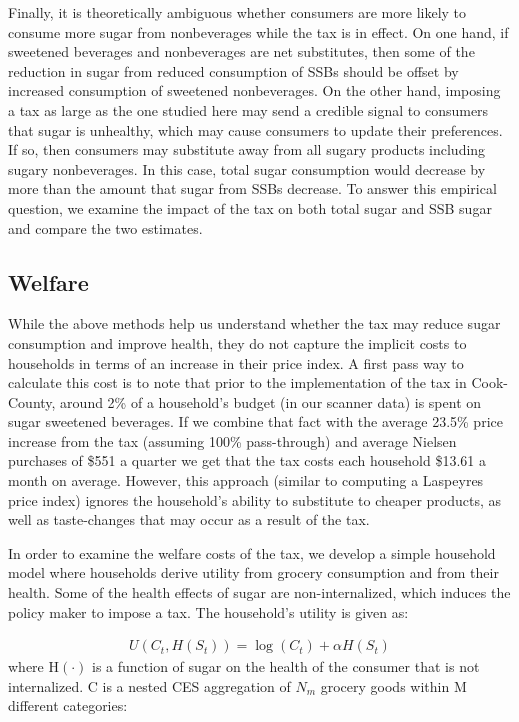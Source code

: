 \documentclass[12pt]{article}
\begin{document}
Finally, it is theoretically ambiguous whether consumers are more likely to consume more sugar from nonbeverages while the tax is in effect. On one hand, if sweetened beverages and nonbeverages are net substitutes, then some of the reduction in sugar from reduced consumption of SSBs should be offset by increased consumption of sweetened nonbeverages. On the other hand, imposing a tax as large as the one studied here may send a credible signal to consumers that sugar is unhealthy, which may cause consumers to update their preferences. If so, then consumers may substitute away from all sugary products including sugary nonbeverages. In this case, total sugar consumption would decrease by more than the amount that sugar from SSBs decrease. To answer this empirical question, we examine the impact of the tax on both total sugar and SSB sugar and compare the two estimates.

\subsection{Welfare}

While the above methods help us understand whether the tax may reduce sugar consumption and improve health, they do not capture the implicit costs to households in terms of an increase in their price index. A first pass way to calculate this cost is to note that prior to the implementation of the tax in Cook-County, around 2\% of a household's budget (in our scanner data) is spent on sugar sweetened beverages. If we combine that fact with the average 23.5\% price increase from the tax (assuming 100\% pass-through) and average Nielsen purchases of \$551 a quarter we get that the tax costs each household \$13.61 a month on average. However, this approach (similar to computing a Laspeyres price index) ignores the household's ability to substitute to cheaper products, as well as taste-changes that may occur as a result of the tax.

In order to examine the welfare costs of the tax, we develop a simple household model where households derive utility from grocery consumption and from their health. Some of the health effects of sugar are non-internalized, which induces the policy maker to impose a tax. The household's utility is given as:

\begin{align}
	U(C_t,H(S_t)) = \log(C_t) + \alpha H(S_t)
\end{align}
where H$(\cdot)$ is a function of sugar on the health of the consumer that is not internalized. C is a nested CES aggregation of $N_m$ grocery goods within M different categories:
\end{document}
